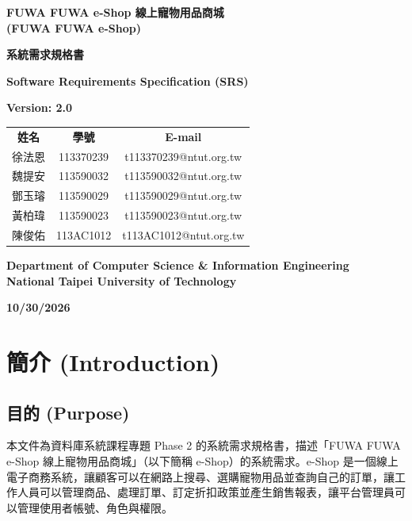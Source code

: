 \documentclass[12pt,a4paper]{article}
\newcommand{\projectname}{FUWA FUWA e-Shop 線上寵物用品商城}
\newcommand{\projectnameEN}{FUWA FUWA e-Shop}
\newcommand{\docdate}{10/30/2026}
\begin{document}
\begin{titlepage}
\centering
\vspace*{1.5cm}
{\Large\bfseries \projectname\\[0.3em] (\projectnameEN)\par}
\vspace{1.5cm}
{\LARGE\bfseries 系統需求規格書\par}
\vspace{0.5cm}
{\Large\bfseries Software Requirements Specification (SRS)\par}
\vspace{0.5cm}
{\large\bfseries Version: 2.0\par}
\vspace{1.2cm}
\renewcommand{\arraystretch}{1.4}
\begin{tabular}{ccc}
\textbf{姓名} & \textbf{學號} & \textbf{E-mail}\\
徐法恩 & 113370239 & t113370239@ntut.org.tw\\
魏提安 & 113590032 & t113590032@ntut.org.tw\\
鄧玉璿 & 113590029 & t113590029@ntut.org.tw\\
黃柏瑋 & 113590023 & t113590023@ntut.org.tw\\
陳俊佑 & 113AC1012 & t113AC1012@ntut.org.tw\\
\end{tabular}
\vfill
{\large\bfseries Department of Computer Science \& Information Engineering\\
National Taipei University of Technology\par}
\vspace{1cm}
{\large\bfseries \docdate\par}
\vspace*{1cm}
\end{titlepage}

\setcounter{page}{1}
\tableofcontents
\clearpage
{}
\setcounter{page}{1}

\section{簡介 (Introduction)}

\subsection{目的 (Purpose)}
本文件為資料庫系統課程專題 Phase 2 的系統需求規格書，描述「\projectname」（以下簡稱 e-Shop）的系統需求。e-Shop 是一個線上電子商務系統，讓顧客可以在網路上搜尋、選購寵物用品並查詢自己的訂單，讓工作人員可以管理商品、處理訂單、訂定折扣政策並產生銷售報表，讓平台管理員可以管理使用者帳號、角色與權限。
\end{document}
